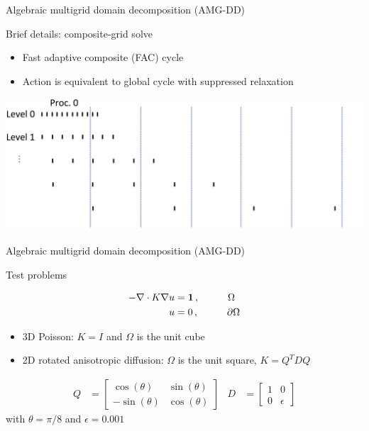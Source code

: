 \documentclass[18pt,xcolor=table]{beamer}
\begin{document}
\begin{frame}{Algebraic multigrid domain decomposition (AMG-DD)}
\begin{block}{Brief details: composite-grid solve}
\begin{itemize}
\item Fast adaptive composite (FAC) cycle
\item Action is equivalent to global cycle with suppressed relaxation
\end{itemize}
\end{block}

\centering
\includegraphics[width=\textwidth]{../figures/compGridCreation1D13}

\end{frame}

\begin{frame}{Algebraic multigrid domain decomposition (AMG-DD)}
\begin{block}{Test problems}

\begin{align*}
-\nabla \cdot K \nabla u &= \mathbf{1}\,, \hspace{1 cm} \Omega \\
u &= 0\,, \hspace{1 cm} \partial \Omega
\end{align*}

\begin{itemize}
\item 3D Poisson: $K = I$ and $\Omega$ is the unit cube
\item 2D rotated anisotropic diffusion: $\Omega$ is the unit square, $K = Q^TDQ$
\end{itemize}

\begin{align*}
Q &= \begin{bmatrix}
\cos(\theta) & \sin(\theta) \\
-\sin(\theta) & \cos(\theta)
\end{bmatrix}
&
D &= \begin{bmatrix}
1 & 0\\
0 & \epsilon
\end{bmatrix}
\end{align*}
with $\theta=\pi/8$ and $\epsilon=0.001$
\end{block}


\end{frame}
\end{document}
